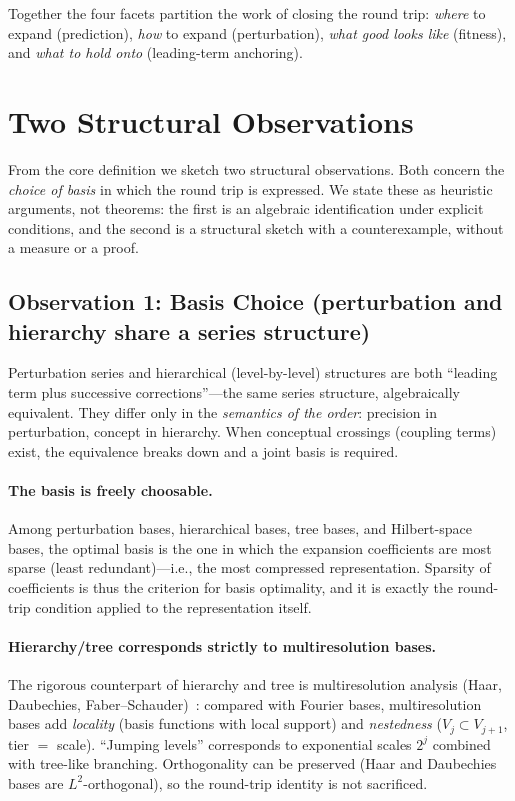 \documentclass[11pt]{article}
\begin{document}
Together the four facets partition the work of closing the round trip:
\emph{where} to expand (prediction), \emph{how} to expand (perturbation),
\emph{what good looks like} (fitness), and \emph{what to hold onto}
(leading-term anchoring).
\section{Two Structural Observations}
\label{sec:derivations}

From the core definition we sketch two structural observations. Both concern the
\emph{choice of basis} in which the round trip is expressed. We state these as
heuristic arguments, not theorems: the first is an algebraic identification
under explicit conditions, and the second is a structural sketch with a
counterexample, without a measure or a proof.

\subsection{Observation 1: Basis Choice (perturbation and hierarchy share a series structure)}
\label{sec:basis}

Perturbation series and hierarchical (level-by-level) structures are both
``leading term plus successive corrections''---the same series structure,
algebraically equivalent. They differ only in the \emph{semantics of the order}:
precision in perturbation, concept in hierarchy. When conceptual crossings
(coupling terms) exist, the equivalence breaks down and a joint basis is
required.

\paragraph{The basis is freely choosable.}
Among perturbation bases, hierarchical bases, tree bases, and Hilbert-space
bases, the optimal basis is the one in which the expansion coefficients are most
sparse (least redundant)---i.e., the most compressed representation. Sparsity of
coefficients is thus the criterion for basis optimality, and it is exactly the
round-trip condition applied to the representation itself.

\paragraph{Hierarchy/tree corresponds strictly to multiresolution bases.}
The rigorous counterpart of hierarchy and tree is multiresolution analysis
(Haar, Daubechies, Faber--Schauder)~\cite{daubechies_1988}: compared with
Fourier bases, multiresolution bases add \emph{locality} (basis functions with
local support) and \emph{nestedness} ($V_j \subset V_{j+1}$, tier $=$ scale).
``Jumping levels'' corresponds to exponential scales $2^{j}$ combined with
tree-like branching. Orthogonality can be preserved (Haar and Daubechies bases
are $L^{2}$-orthogonal), so the round-trip identity is not sacrificed.
\end{document}
